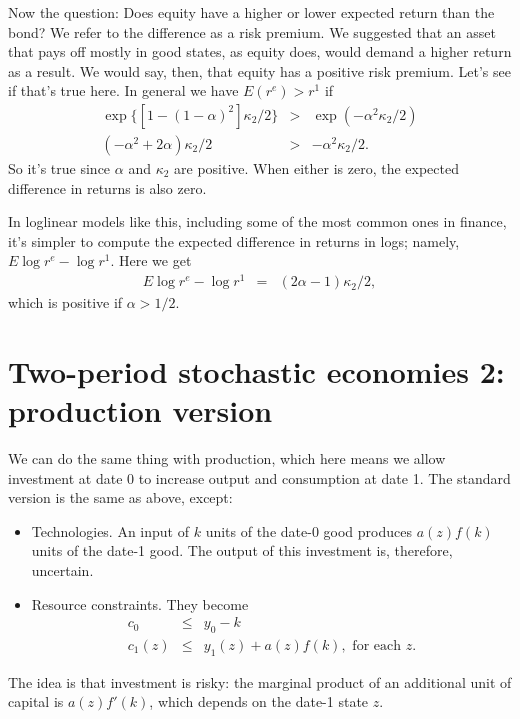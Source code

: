 \documentclass[11pt]{article}
\begin{document}
Now the question:  Does equity have a higher or lower expected return than the bond?
We refer to the difference as a risk premium.
We suggested that an asset that pays off mostly in good states,
as equity does, would demand a higher return as a result.
We would say, then, that equity has a positive risk premium.
Let's see if that's true here.
In general we have $E(r^e) > r^1$ if
\begin{eqnarray*}
    \exp\{ [1 - (1-\alpha)^2] \kappa_2/2 \}
            &>& \exp(-\alpha^2 \kappa_2/2) \\
     (-\alpha^2 + 2 \alpha) \kappa_2/2 &>& -\alpha^2 \kappa_2/2  .
\end{eqnarray*}
So it's true since $\alpha$ and $\kappa_2$ are positive.
When either is zero, the expected difference in returns
is also zero.


In loglinear models like this,
including some of the most common ones in finance,
it's simpler to compute the expected difference in returns in logs;
namely, $ E \log r^e - \log r^1 $.
Here we get
\begin{eqnarray*}
    E  \log r^e - \log r^1  &=& (2 \alpha - 1) \kappa_2 /2 ,
\end{eqnarray*}
which is positive if $\alpha > 1/2$.


\section{Two-period stochastic economies 2:  production version}

We can do the same thing with production, which here means
we allow investment at date 0 to increase output and consumption
at date 1.
The standard version
is the same as above, except:
\begin{itemize}
\item Technologies.  An input of $k$ units of the date-0 good
produces $ a(z) f(k)$ units of the date-1 good.
The output of this investment is, therefore, uncertain.
\item Resource constraints.  They become
\begin{eqnarray*}
    c_0 &\leq& y_0 - k \\
    c_1(z) &\leq& y_1(z) + a(z) f(k), \mbox{ for each } z .
\end{eqnarray*}
\end{itemize}
The idea is that investment is risky:  the marginal product
of an additional unit of capital is $a(z) f'(k)$,
which depends on the date-1 state $z$.
\end{document}
